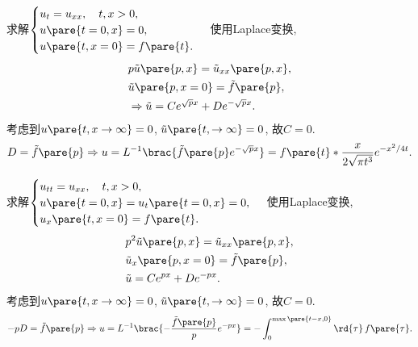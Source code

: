 \documentclass[hidelinks]{ctexart}
\begin{document}
\begin{sample}
    \begin{ex}
        求解$\displaystyle \begin{cases}
            u_t = u_{xx},\quad t,x>0, \\
            u\pare{t=0,x} = 0, \\
            u\pare{t,x=0} = f\pare{t}.
        \end{cases}$ 使用Laplace变换,
        \begin{align*}
            & p\tilde{u}\pare{p,x} = \tilde{u}_{xx}\pare{p,x}, \\
            & \tilde{u}\pare{p,x=0} = \tilde{f}\pare{p}, \\
            & \Rightarrow \tilde{u} = C e^{\sqrt{p} x} + D e^{-\sqrt{p}x}.
        \end{align*}
        考虑到$u\pare{t,x\rightarrow \infty} = 0$, $\tilde{u}\pare{t,\rightarrow \infty} = 0$, 故$C=0$.
        \[ D = \tilde{f}\pare{p} \Rightarrow u = L^{-1}\brac{\tilde{f}\pare{p} e^{-\sqrt{p}x}} = f\pare{t} * \frac{x}{2\sqrt{\pi t^3}} e^{-x^2/4t}. \]
    \end{ex}
\end{sample}
\begin{sample}
    \begin{ex}
        求解$\displaystyle \begin{cases}
            u_{tt} = u_{xx},\quad t,x>0, \\
            u\pare{t=0,x} = u_t\pare{t=0,x} = 0, \\
            u_x\pare{t,x=0} = f\pare{t}.
        \end{cases}$ 使用Laplace变换,
        \begin{align*}
            & p^2 \tilde{u}\pare{p,x} = \tilde{u}_{xx}\pare{p,x}, \\
            & \tilde{u}_x\pare{p,x=0} = \tilde{f}\pare{p}, \\
            & \tilde{u} = Ce^{px} + De^{-px}.
        \end{align*}
        考虑到$u\pare{t,x\rightarrow \infty} = 0$, $\tilde{u}\pare{t,\rightarrow \infty} = 0$, 故$C=0$.
        \[ -pD = \tilde{f}\pare{p} \Rightarrow u = L^{-1}\brac{-\frac{\tilde{f}\pare{p}}{p}e^{-px}} = -\int_0^{\max \pare{t-x,0}} \rd{\tau}\,f\pare{\tau}. \]
    \end{ex}
\end{sample}
\end{document}
